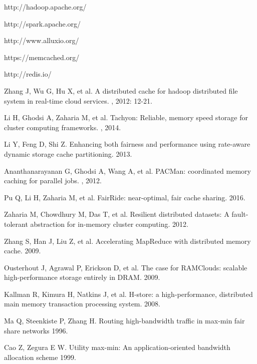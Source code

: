 \documentclass[10pt,conference,letterpaper]{IEEEtran}
\begin{document}
\begin{thebibliography}{1}

 http://hadoop.apache.org/

 http://spark.apache.org/

 http://www.alluxio.org/

 https://memcached.org/

 http://redis.io/

 Zhang J, Wu G, Hu X, et al.
\newblock A distributed cache for hadoop distributed file system in real-time cloud services.
, 2012: 12-21.

 Li H, Ghodsi A, Zaharia M, et al. 
\newblock Tachyon: Reliable, memory speed storage for cluster computing frameworks.
, 2014.

 Li Y, Feng D, Shi Z. 
\newblock Enhancing both fairness and performance using rate-aware dynamic storage cache partitioning.
 2013.

 Ananthanarayanan G, Ghodsi A, Wang A, et al. 
\newblock PACMan: coordinated memory caching for parallel jobs.
, 2012.

 Pu Q, Li H, Zaharia M, et al. 
\newblock FairRide: near-optimal, fair cache sharing.
 2016. 

 Zaharia M, Chowdhury M, Das T, et al. 
\newblock Resilient distributed datasets: A fault-tolerant abstraction for in-memory cluster computing.
 2012.

 Zhang S, Han J, Liu Z, et al. 
\newblock Accelerating MapReduce with distributed memory cache.
 2009.

 Ousterhout J, Agrawal P, Erickson D, et al. 
\newblock The case for RAMClouds: scalable high-performance storage entirely in DRAM. 
 2009.

 Kallman R, Kimura H, Natkins J, et al. 
\newblock H-store: a high-performance, distributed main memory transaction processing system. 
 2008.

 Ma Q, Steenkiste P, Zhang H.
\newblock Routing high-bandwidth traffic in max-min fair share networks
 1996.

 Cao Z, Zegura E W. 
\newblock Utility max-min: An application-oriented bandwidth allocation scheme
 1999.


\end{thebibliography}
\end{document}
